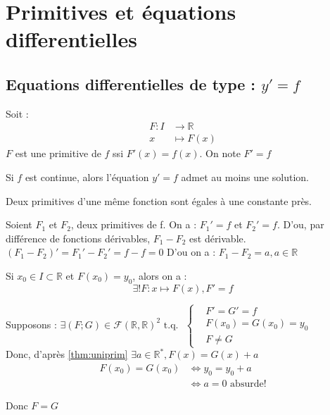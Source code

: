 \chapter{Primitives et équations differentielles}
\section{Equations differentielles de type : \(y' = f\)}

\begin{definition}[Primitive]\label{def:primitive}
    Soit : \begin{align*}
        F: I &\longrightarrow \mathbb{R} \\
         x &\longmapsto F(x) 
    \end{align*}
    \(F\) est une primitive de \(f\) ssi \(F'(x) = f(x)\). On note \(F' = f\) 
\end{definition}

\begin{theorem}\label{thm:pcont}
    Si \(f\) est continue, alors l'équation \(y' = f\)  admet au moins une solution.
\end{theorem}

\begin{theorem}\label{thm:uniprim}
    Deux primitives d'une même fonction sont égales à une constante près. 
\end{theorem}

\begin{explanation}
    Soient \(F_{1}\) et \(F_{2}\), deux primitives de f. On a : \(F_{1}' = f\) et \(F_{2}' = f\). D'ou, par différence de fonctions dérivables, \(F_{1}-F_{2}\) est dérivable.\\
    \((F_{1}-F_{2})' = F_{1}'-F_{2}' = f-f = 0\) D'ou on a : \(F_{1}-F_{2} = a, a \in \mathbb{R}\)      
\end{explanation}
\begin{corollary}\label{col:unisol}
    Si \(x_{0} \in I \subset \mathbb{R}\) et \(F(x_{0}) = y_{0}\), alors on a : \\
    \[
        \exists! F: x \mapsto F(x), F' = f
    \]  
\end{corollary}

\begin{explanation}
    Supposons : \(\exists (F;G) \in \mathcal{F}(\mathbb{R},\mathbb{R})^{2} \text{ t.q. }\) \(\begin{cases}
        &F' = G' = f\\
        &F(x_{0}) = G(x_{0}) = y_{0}\\
        &F \neq G
    \end{cases}\)\\
    Donc, d'après \autoref{thm:uniprim} \(\exists a \in \mathbb{R}^{*}, F(x) = G(x) + a\) 
    \begin{align*}
        F(x_{0}) = G(x_{0}) & \iff y_{0} = y_{0} + a\\
        & \iff a = 0 \text{ absurde!}
    \end{align*} 
    
    Donc \(F=G\) 
\end{explanation}
